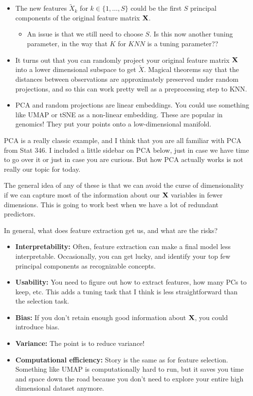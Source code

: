 \begin{itemize}
\item The new features $\tilde{X}_k$ for  $k \in \{1,\ldots, S\}$ could be the first $S$ principal components of the original feature matrix $\bold{X}$. \begin{itemize}
\item An issue is that we still need to choose $S$. Is this now another tuning parameter, in the way that $K$ for $KNN$ is a tuning parameter?? 
\end{itemize}
\item It turns out that you can randomly project your original feature matrix $\bold{X}$ into a lower dimensional subspace to get $\tilde{X}$. Magical theorems say that the distances between observations are approximately preserved under random projections, and so this can work pretty well as a preprocessing step to KNN. 
\item PCA and random projections are linear embeddings. You could use something like UMAP or tSNE as a non-linear embedding. These are popular in genomics! They put your points onto a low-dimensional manifold. 
\end{itemize}

PCA is a really classic example, and I think that you are all familiar with PCA from Stat 346. I included a little sidebar on PCA below, just in case we have time to go over it or just in case you are curious. But how PCA actually works is not really our topic for today. 

The general idea of any of these is that we can avoid the curse of dimensionality if we can capture most of the information about our $\bold{X}$ variables in fewer dimensions. This is going to work best when we have a lot of redundant predictors. 

In general, what does feature extraction get us, and what are the risks? 
\begin{itemize}
\item \textbf{Interpretability:} Often, feature extraction can make a final model less interpretable. Occasionally, you can get lucky, and identify your top few principal components as recognizable concepts. 
\item \textbf{Usability:} You need to figure out how to extract features, how many PCs to keep, etc. This adds a tuning task that I think is less straightforward than the selection task. 
\item \textbf{Bias:} If you don't retain enough good information about $\bold{X}$, you could introduce bias. 
\item \textbf{Variance:} The point is to reduce variance! 
\item \textbf{Computational efficiency:} Story is the same as for feature selection. Something like UMAP is computationally hard to run, but it saves you time and space down the road because you don't need to explore your entire high dimensional dataset anymore. 
\end{itemize}

